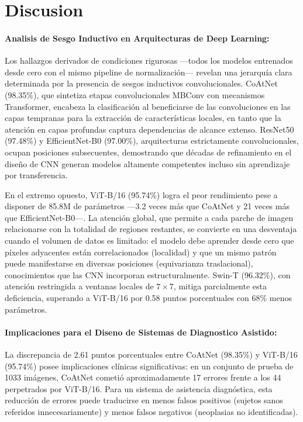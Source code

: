 \section{Discusion}
\label{sec:discussion}

\paragraph{Analisis de Sesgo Inductivo en Arquitecturas de Deep Learning:}

Los hallazgos derivados de condiciones rigurosas —todos los modelos entrenados desde cero con el mismo pipeline de normalización— revelan una jerarquía clara determinada por la presencia de sesgos inductivos convolucionales. CoAtNet (98.35\%), que sintetiza etapas convolucionales MBConv con mecanismos Transformer, encabeza la clasificación al beneficiarse de las convoluciones en las capas tempranas para la extracción de características locales, en tanto que la atención en capas profundas captura dependencias de alcance extenso. ResNet50 (97.48\%) y EfficientNet-B0 (97.00\%), arquitecturas estrictamente convolucionales, ocupan posiciones subsecuentes, demostrando que décadas de refinamiento en el diseño de CNN generan modelos altamente competentes incluso sin aprendizaje por transferencia.

En el extremo opuesto, ViT-B/16 (95.74\%) logra el peor rendimiento pese a disponer de 85.8M de parámetros —3.2 veces más que CoAtNet y 21 veces más que EfficientNet-B0—. La atención global, que permite a cada parche de imagen relacionarse con la totalidad de regiones restantes, se convierte en una desventaja cuando el volumen de datos es limitado: el modelo debe aprender desde cero que píxeles adyacentes están correlacionados (localidad) y que un mismo patrón puede manifestarse en diversas posiciones (equivarianza traslacional), conocimientos que las CNN incorporan estructuralmente. Swin-T (96.32\%), con atención restringida a ventanas locales de $7\times7$, mitiga parcialmente esta deficiencia, superando a ViT-B/16 por 0.58 puntos porcentuales con 68\% menos parámetros.

\paragraph{Implicaciones para el Diseno de Sistemas de Diagnostico Asistido:}

La discrepancia de 2.61 puntos porcentuales entre CoAtNet (98.35\%) y ViT-B/16 (95.74\%) posee implicaciones clínicas significativas: en un conjunto de prueba de 1033 imágenes, CoAtNet cometió aproximadamente 17 errores frente a los 44 perpetrados por ViT-B/16. Para un sistema de asistencia diagnóstica, esta reducción de errores puede traducirse en menos falsos positivos (sujetos sanos referidos innecesariamente) y menos falsos negativos (neoplasias no identificadas).

